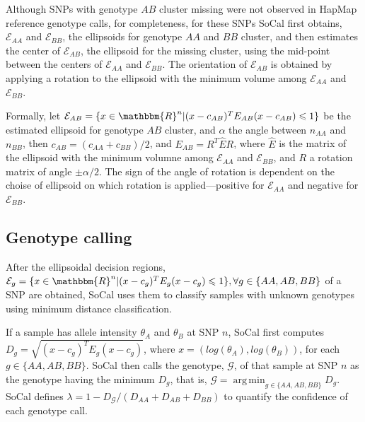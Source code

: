 \documentclass{scrartcl}
\begin{document}
Although SNPs with genotype $AB$ cluster missing were not observed in HapMap
reference genotype calls, for completeness, for these SNPs SoCal first
obtains, $\mathcal{E}_{AA}$ and $\mathcal{E}_{BB}$,
the ellipsoids for genotype $AA$ and $BB$ cluster, and then estimates the
center of $\mathcal{E}_{AB}$, the ellipsoid for the missing cluster, using
the mid-point between the centers of $\mathcal{E}_{AA}$ and $\mathcal{E}_{BB}$.
The orientation of $\mathcal{E}_{AB}$ is obtained by applying a rotation
to the ellipsoid with the minimum volume among $\mathcal{E}_{AA}$ and
$\mathcal{E}_{BB}$.

\par
Formally, let $\mathcal{E}_{AB}=
\{x \in \mathbbm{R}^{n}|(x-c_{AB})^TE_{AB}(x-c_{AB}) \leqslant 1\}$ be the
estimated ellipsoid for genotype $AB$ cluster, and $\alpha$ the angle between
$n_{AA}$ and $n_{BB}$, then
$c_{AB}=(c_{AA}+c_{BB})/2$, and
$E_{AB}=R^{T}\hat{E}R$, where $\hat{E}$ is the matrix of the ellipsoid
with the minimum volumne among $\mathcal{E}_{AA}$ and $\mathcal{E}_{BB}$, and
$R$ a rotation matrix of angle $\pm\alpha/2$.
The sign of the angle of rotation is dependent on the choise of ellipsoid on
which rotation is applied---positive for $\mathcal{E}_{AA}$ and negative
for $\mathcal{E}_{BB}$.

\subsection{Genotype calling}

\par
After the ellipsoidal decision regions,
$\mathcal{E}_{g}=
\{x \in \mathbbm{R}^{n} | (x-c_g)^TE_g(x-c_g) \leqslant 1\},
\forall g\in\{AA,AB,BB\}$ of a SNP are obtained, SoCal uses them to classify
samples with unknown genotypes using minimum distance classification.

\par
If a sample has allele intensity $\theta_A$ and $\theta_B$ at SNP $n$,
SoCal first computes
$D_g=\sqrt{(x-c_g)^TE_g(x-c_g)}$,
where $x=(log(\theta_A), log(\theta_B))$, for each $g\in\{AA,AB,BB\}$.
SoCal then calls the genotype, $\mathcal{G}$, of that sample at SNP $n$
as the genotype having the minimum $D_g$, that is,
$\mathcal{G}=\operatorname*{arg\,min}_{g\in \{AA,AB,BB\}}D_g$.
SoCal defines $\lambda=1-D_{\mathcal{G}}/(D_{AA}+D_{AB}+D_{BB})$ to quantify
the confidence of each genotype call. 
\end{document}
